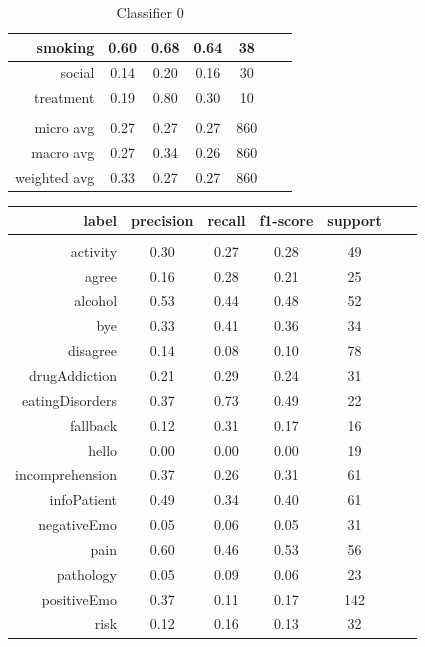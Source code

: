 \documentclass[11pt]{article}
\begin{document}
\begin{table}[htb]
\begin{center}
\begin{tabular}{ |r|c|c|c|c|c|c| }
smoking 		&  0.60 & 0.68 & 0.64 &   38\\ \hline 
social 			&  0.14 & 0.20 & 0.16 &   30\\ \hline 
treatment		&  0.19 & 0.80 & 0.30 &   10\\ \hline 
\\ \hline 
micro avg 		&  0.27 & 0.27 & 0.27 &  860\\ \hline 
macro avg 		&  0.27 & 0.34 & 0.26 &  860\\ \hline 
weighted avg 	&  0.33 & 0.27 & 0.27 &  860\\ \hline 
\end{tabular}
\caption{Classifier 0}
\end{center}
\end{table}
\FloatBarrier

\begin{table}[htb]
\begin{center}
\begin{tabular}{ |r|c|c|c|c|c|c| }
label 			& precision & recall & f1-score & support\\ \hline 
\\ \hline 
activity 		&  0.30 & 0.27 & 0.28 &   49\\ \hline 
agree 			&  0.16 & 0.28 & 0.21 &   25\\ \hline 
alcohol 		&  0.53 & 0.44 & 0.48 &   52\\ \hline 
bye 			&  0.33 & 0.41 & 0.36 &   34\\ \hline 
disagree 		&  0.14 & 0.08 & 0.10 &   78\\ \hline 
drugAddiction 	&  0.21 & 0.29 & 0.24 &   31\\ \hline 
eatingDisorders &  0.37 & 0.73 & 0.49 &   22\\ \hline 
fallback 		&  0.12 & 0.31 & 0.17 &   16\\ \hline 
hello 			&  0.00 & 0.00 & 0.00 &   19\\ \hline 
incomprehension &  0.37 & 0.26 & 0.31 &   61\\ \hline 
infoPatient 	&  0.49 & 0.34 & 0.40 &   61\\ \hline 
negativeEmo 	&  0.05 & 0.06 & 0.05 &   31\\ \hline 
pain 			&  0.60 & 0.46 & 0.53 &   56\\ \hline 
pathology 		&  0.05 & 0.09 & 0.06 &   23\\ \hline 
positiveEmo 	&  0.37 & 0.11 & 0.17 &  142\\ \hline 
risk 			&  0.12 & 0.16 & 0.13 &   32\\ \hline 

\end{tabular}
\end{center}
\end{table}
\end{document}
